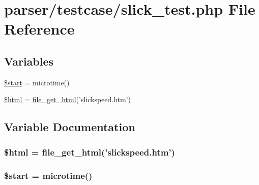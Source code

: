 \hypertarget{slick__test_8php}{\section{parser/testcase/slick\+\_\+test.php File Reference}
\label{slick__test_8php}
}
\subsection*{Variables}
\begin{DoxyCompactItemize}
\item 
\hyperlink{slick__test_8php_a50a00e7de77365e00b117e73aa82fb9b}{\$start} = microtime()
\item 
\hyperlink{slick__test_8php_a6f96e7fc92441776c9d1cd3386663b40}{\$html} = \hyperlink{simple__html__dom_8php_af2164941db8b68168c1105687e179d27}{file\+\_\+get\+\_\+html}('slickspeed.\+htm')
\end{DoxyCompactItemize}


\subsection{Variable Documentation}
\hypertarget{slick__test_8php_a6f96e7fc92441776c9d1cd3386663b40}{
\subsubsection[{\$html}]{\setlength{\rightskip}{0pt plus 5cm}\$html = {\bf file\+\_\+get\+\_\+html}('slickspeed.\+htm')}}\label{slick__test_8php_a6f96e7fc92441776c9d1cd3386663b40}
\hypertarget{slick__test_8php_a50a00e7de77365e00b117e73aa82fb9b}{
\subsubsection[{\$start}]{\setlength{\rightskip}{0pt plus 5cm}\$start = microtime()}}\label{slick__test_8php_a50a00e7de77365e00b117e73aa82fb9b}

